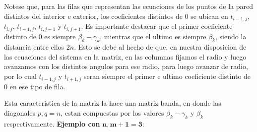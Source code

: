 \medskip
Notese que, para las filas que representan las ecuaciones de los puntos de la pared distintos del interior e exterior, los coeficientes distintos de 0 se ubican en $t_{i-1,j}$, $t_{i,j}$, $t_{i+1,j}$, $t_{i,j-1}$ y $t_{i,j+1}$.
Es importante destacar que el primer coeficiente distinto de 0 es siempre $\beta_{k} - \gamma_{k}$, mientras que el ultimo es siempre $\beta_{k}$, siendo la distancia entre ellos $2n$. Esto se debe al hecho de que, en nuestra disposicion de las ecuaciones del sistema en la matriz,
en las columnas fijamos el radio y luego avanzamos con los distintos angulos para ese radio, para luego avanzar de radio, por lo cual $t_{i-1,j}$ y $t_{i+1,j}$ seran siempre el primer e ultimo coeficiente distinto de 0 en ese tipo de fila.

Esta caracteristica de la matriz la hace una matriz banda, en donde las diagonales $p, q = n$, estan compuestas por los valores $\beta_{k} - \gamma_{k}$ y $\beta_{k}$ respectivamente.
\newline
\newline
\textbf{Ejemplo con} $\bm{n,m+1=3}$:
\begingroup
    \fontsize{8pt}{10pt}\selectfont
